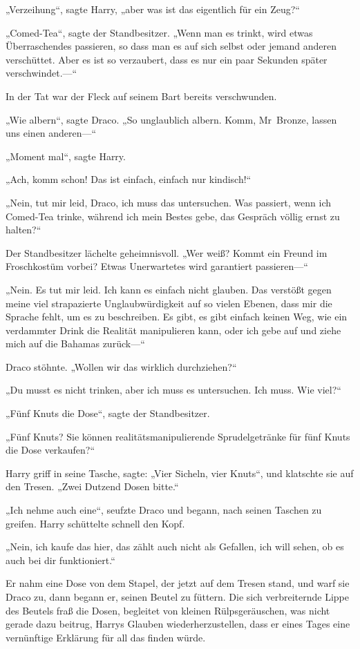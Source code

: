 {„Verzeihung“, sagte Harry, „aber was ist das eigentlich für ein Zeug?“

„Comed-Tea“, sagte der Standbesitzer. „Wenn man es trinkt, wird etwas Überraschendes passieren, so dass man es auf sich selbst oder jemand anderen verschüttet. Aber es ist so verzaubert, dass es nur ein paar Sekunden später verschwindet.—“

In der Tat war der Fleck auf seinem Bart bereits verschwunden.

„Wie albern“, sagte Draco. „So unglaublich albern. Komm, Mr~Bronze, lassen uns einen anderen—“

„Moment mal“, sagte Harry.

„Ach, komm schon! Das ist einfach, einfach nur kindisch!“

„Nein, tut mir leid, Draco, ich muss das untersuchen. Was passiert, wenn ich Comed-Tea trinke, während ich mein Bestes gebe, das Gespräch völlig ernst zu halten?“

Der Standbesitzer lächelte geheimnisvoll. „Wer weiß? Kommt ein Freund im Froschkostüm vorbei? Etwas Unerwartetes wird garantiert passieren—“

„Nein. Es tut mir leid. Ich kann es einfach nicht glauben. Das verstößt gegen meine viel strapazierte Unglaubwürdigkeit auf so vielen Ebenen, dass mir die Sprache fehlt, um es zu beschreiben. Es gibt, es gibt einfach keinen Weg, wie ein verdammter Drink die Realität manipulieren kann, oder ich gebe auf und ziehe mich auf die Bahamas zurück—“

Draco stöhnte. „Wollen wir das wirklich durchziehen?“

„Du musst es nicht trinken, aber ich muss es untersuchen. Ich muss. Wie viel?“

„Fünf Knuts die Dose“, sagte der Standbesitzer.

„Fünf Knuts? Sie können realitätsmanipulierende Sprudelgetränke für fünf Knuts die Dose verkaufen?“

Harry griff in seine Tasche, sagte: „Vier Sicheln, vier Knuts“, und klatschte sie auf den Tresen. „Zwei Dutzend Dosen bitte.“

„Ich nehme auch eine“, seufzte Draco und begann, nach seinen Taschen zu greifen. Harry schüttelte schnell den Kopf.

„Nein, ich kaufe das hier, das zählt auch nicht als Gefallen, ich will sehen, ob es auch bei dir funktioniert.“

Er nahm eine Dose von dem Stapel, der jetzt auf dem Tresen stand, und warf sie Draco zu, dann begann er, seinen Beutel zu füttern. Die sich verbreiternde Lippe des Beutels fraß die Dosen, begleitet von kleinen Rülpsgeräuschen, was nicht gerade dazu beitrug, Harrys Glauben wiederherzustellen, dass er eines Tages eine vernünftige Erklärung für all das finden würde.

}
